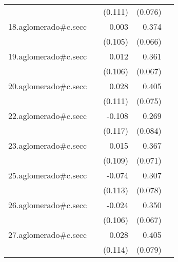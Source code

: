 {\begin{longtable}{l*{4}{D{.}{.}{-1}}}
            &                     &     (0.111)         &     (0.076)         &                     \\
\addlinespace
18.aglomerado#c.secc&                     &       0.003         &       0.374\sym{***}&                     \\
            &                     &     (0.105)         &     (0.066)         &                     \\
\addlinespace
19.aglomerado#c.secc&                     &       0.012         &       0.361\sym{***}&                     \\
            &                     &     (0.106)         &     (0.067)         &                     \\
\addlinespace
20.aglomerado#c.secc&                     &       0.028         &       0.405\sym{***}&                     \\
            &                     &     (0.111)         &     (0.075)         &                     \\
\addlinespace
22.aglomerado#c.secc&                     &      -0.108         &       0.269\sym{**} &                     \\
            &                     &     (0.117)         &     (0.084)         &                     \\
\addlinespace
23.aglomerado#c.secc&                     &       0.015         &       0.367\sym{***}&                     \\
            &                     &     (0.109)         &     (0.071)         &                     \\
\addlinespace
25.aglomerado#c.secc&                     &      -0.074         &       0.307\sym{***}&                     \\
            &                     &     (0.113)         &     (0.078)         &                     \\
\addlinespace
26.aglomerado#c.secc&                     &      -0.024         &       0.350\sym{***}&                     \\
            &                     &     (0.106)         &     (0.067)         &                     \\
\addlinespace
27.aglomerado#c.secc&                     &       0.028         &       0.405\sym{***}&                     \\
            &                     &     (0.114)         &     (0.079)         &                     \\

\end{longtable}}
